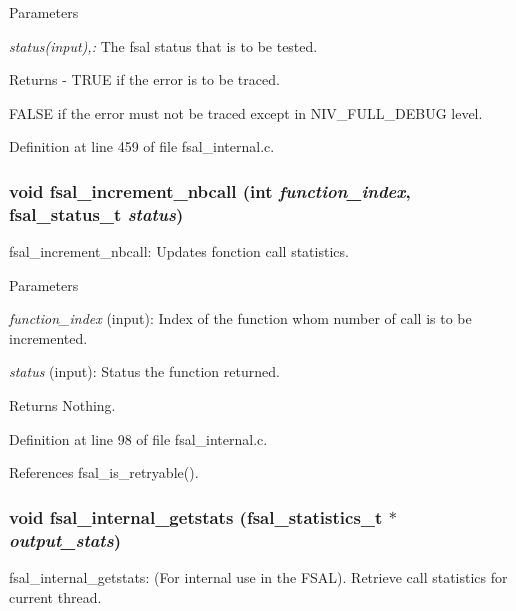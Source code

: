 \begin{DoxyParams}{Parameters}
\item[{\em status(input),:}]The fsal status that is to be tested.\end{DoxyParams}
\begin{DoxyReturn}{Returns}
-\/ TRUE if the error is to be traced.
\begin{DoxyItemize}
\item FALSE if the error must not be traced except in NIV\_\-FULL\_\-DEBUG level. 
\end{DoxyItemize}
\end{DoxyReturn}


Definition at line 459 of file fsal\_\-internal.c.
\subsubsection[{fsal\_\-increment\_\-nbcall}]{\setlength{\rightskip}{0pt plus 5cm}void fsal\_\-increment\_\-nbcall (int {\em function\_\-index}, \/  fsal\_\-status\_\-t {\em status})}\label{fsal__internal_8c_a79dcb2ba7f283a1ba5c6010d76fa88f1}
fsal\_\-increment\_\-nbcall: Updates fonction call statistics.


\begin{DoxyParams}{Parameters}
\item[{\em function\_\-index}](input): Index of the function whom number of call is to be incremented. \item[{\em status}](input): Status the function returned.\end{DoxyParams}
\begin{DoxyReturn}{Returns}
Nothing. 
\end{DoxyReturn}


Definition at line 98 of file fsal\_\-internal.c.

References fsal\_\-is\_\-retryable().
\subsubsection[{fsal\_\-internal\_\-getstats}]{\setlength{\rightskip}{0pt plus 5cm}void fsal\_\-internal\_\-getstats (fsal\_\-statistics\_\-t $\ast$ {\em output\_\-stats})}\label{fsal__internal_8c_a6de88949985cac9da4cd3fb302fb80a7}
fsal\_\-internal\_\-getstats: (For internal use in the FSAL). Retrieve call statistics for current thread.


